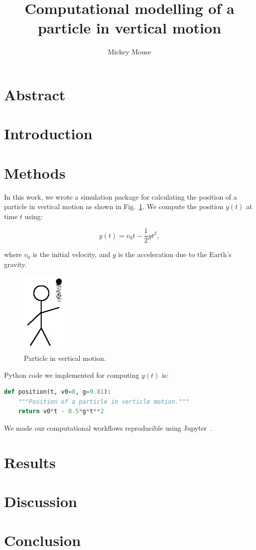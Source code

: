 \documentclass[project-plan]{report-template}
\title{Computational modelling of a particle in vertical motion}
\author{Mickey Mouse}
\begin{document}
\maketitlepage  %

\section*{Abstract}
\blindtext  %

\section{Introduction}
\blindtext[3]

\section{Methods}
In this work, we wrote a simulation package for calculating the position of a particle in vertical motion as shown in Fig.~\ref{fig:experiment}. We compute the position $y(t)$ at time $t$ using:

\begin{equation}
    \label{eq:vertical-position}
    y(t) = v_{0}t - \frac{1}{2}gt^{2},
\end{equation}

where $v_{0}$ is the initial velocity, and $g$ is the acceleration due to the Earth's gravity.

\begin{figure}
    \begin{center}
        \includegraphics[width=0.2\textwidth]{experiment.jpg}
    \end{center}
    \caption{\label{fig:experiment} Particle in vertical motion.}
\end{figure}

Python code we implemented for computing $y(t)$ is:

\begin{lstlisting}[language=Python]
def position(t, v0=0, g=9.81):
    """Position of a particle in verticle motion."""
    return v0*t - 0.5*g*t**2
\end{lstlisting}

We made our computational workflows reproducible using Jupyter~\cite{Beg2021}.

\section{Results}
\blindtext[3]

\section{Discussion}
\blindtext[2]

\section{Conclusion}
\blindtext[2]


\end{document}
